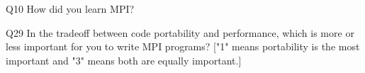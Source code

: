 \begin{description}%
\item{Q10} How did you learn MPI?%
\item{Q29} In the tradeoff between code portability and performance, which is more or less important for you to write MPI programs? ["1" means portability is the most important and "3" means both are equally important.]%
\end{description}%
